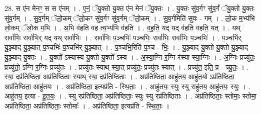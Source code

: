 \documentclass[17pt]{extarticle}
\begin{document}
28. स ए॑न मेनꣳ॒॒ स स ए॑नम् । . ए॒नं॒ ॅयु॒क्तो यु॒क्त ए॑न मेनं ॅयु॒क्तः । . यु॒क्तः सु॑व॒र्गꣳ सु॑व॒र्गं ॅयु॒क्तो यु॒क्तः सु॑व॒र्गम् । . सु॒व॒र्गम् ॅलो॒कम् ॅलो॒कꣳ सु॑व॒र्गꣳ सु॑व॒र्गम् ॅलो॒कम् । . सु॒व॒र्गमिति॑ सुवः - गम् । . लो॒क म॒भ्य॑भि लो॒कम् ॅलो॒क म॒भि । . अ॒भि व॑हति वह त्य॒भ्य॑भि व॑हति । . व॒ह॒ति॒ यद् यद् व॑हति वहति॒ यत् । . यथ् सर्वा॑भिः॒ सर्वा॑भि॒र् यद् यथ् सर्वा॑भिः । . सर्वा॑भिः प॒ञ्चभिः॑ प॒ञ्चभिः॒ सर्वा॑भिः॒ सर्वा॑भिः प॒ञ्चभिः॑ । . प॒ञ्चभि॑र् यु॒ञ्ज्याद् यु॒ञ्ज्यात् प॒ञ्चभिः॑ प॒ञ्चभि॑र् यु॒ञ्ज्यात् । . प॒ञ्चभि॒रिति॑ प॒ञ्च - भिः॒ । . यु॒ञ्ज्याद् यु॒क्तो यु॒क्तो यु॒ञ्ज्याद् यु॒ञ्ज्याद् यु॒क्तः । . यु॒क्तो᳚ ऽस्यास्य यु॒क्तो यु॒क्तो᳚ ऽस्य । . अ॒स्या॒ग्नि र॒ग्नि र॑स्या स्या॒ग्निः । . अ॒ग्निः प्रच्यु॑तः॒ प्रच्यु॑तो॒ ऽग्नि र॒ग्निः प्रच्यु॑तः । . प्रच्यु॑तः स्याथ् स्या॒त् प्रच्यु॑तः॒ प्रच्यु॑तः स्यात् । . प्रच्यु॑त॒ इति॒ प्र - च्यु॒तः॒ । . स्या॒ दप्र॑तिष्ठिता॒ अप्र॑तिष्ठिताः स्याथ् स्या॒ दप्र॑तिष्ठिताः । . अप्र॑तिष्ठिता॒ आहु॑तय॒ आहु॑त॒यो ऽप्र॑तिष्ठिता॒ अप्र॑तिष्ठिता॒ आहु॑तयः । . अप्र॑तिष्ठिता॒ इत्यप्र॑ति - स्थि॒ताः॒ । . आहु॑तयः॒ स्युः स्यु राहु॑तय॒ आहु॑तयः॒ स्युः । . आहु॑तय॒ इत्या - हु॒त॒यः॒ । . स्यु रप्र॑तिष्ठिता॒ अप्र॑तिष्ठिताः॒ स्युः स्यु रप्र॑तिष्ठिताः । . अप्र॑तिष्ठिताः॒ स्तोमाः॒ स्तोमा॒ अप्र॑तिष्ठिता॒ अप्र॑तिष्ठिताः॒ स्तोमाः᳚ । . अप्र॑तिष्ठिता॒ इत्यप्र॑ति - स्थि॒ताः॒ । \newline
\end{document}
